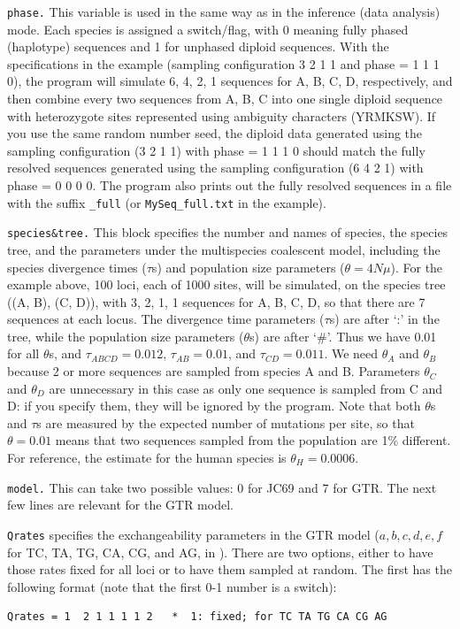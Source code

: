 \documentclass[a4paper]{book}
\numberwithin{equation}{section} \renewcommand{\baselinestretch}{0.55}
\begin{document}
\texttt{phase.}  This variable is used in the same way as in the
inference (data analysis) mode. Each species is assigned a
switch/flag, with 0 meaning fully phased (haplotype) sequences and 1
for unphased diploid sequences.  With the specifications in the
example (sampling configuration 3 2 1 1 and phase = 1 1 1 0), the
program will simulate 6, 4, 2, 1 sequences for A, B, C, D,
respectively, and then combine every two sequences from A, B, C into
one single diploid sequence with heterozygote sites represented using
ambiguity characters (YRMKSW).  If you use the same random number
seed, the diploid data generated using the sampling configuration (3 2
1 1) with phase = 1 1 1 0 should match the fully resolved sequences
generated using the sampling configuration (6 4 2 1) with phase = 0 0
0 0.  The program also prints out the fully resolved sequences in a
file with the suffix \texttt{\_full} (or \texttt{MySeq\_full.txt} in
the example).

\texttt{species\&tree.}  This block specifies the number and names of
species, the species tree, and the parameters under the multispecies
coalescent model, including the species divergence times ($\tau$s) and
population size parameters ($\theta = 4N\mu$).  For the example above,
100 loci, each of 1000 sites, will be simulated, on the species tree
((A, B), (C, D)), with 3, 2, 1, 1 sequences for A, B, C, D, so that
there are 7 sequences at each locus.  The divergence time parameters
($\tau$s) are after `:' in the tree, while the population size
parameters ($\theta$s) are after `\#'.  Thus we have 0.01 for all
$\theta$s, and $\tau_{ABCD} = 0.012$, $\tau_{AB} = 0.01$, and
$\tau_{CD} = 0.011$.  We need $\theta_A$ and $\theta_B$ because 2 or
more sequences are sampled from species A and B.  Parameters
$\theta_C$ and $\theta_D$ are unnecessary in this case as only one
sequence is sampled from C and D: if you specify them, they will be
ignored by the program.  Note that both $\theta$s and $\tau$s are
measured by the expected number of mutations per site, so that
$\theta = 0.01$ means that two sequences sampled from the population
are 1\% different.  For reference, the estimate for the human species
is $\theta_H = 0.0006$.

\texttt{model.} This can take two possible values: 0 for JC69 and 7
for GTR. The next few lines are relevant for the GTR model.

\texttt{Qrates} specifies the exchangeability parameters in the GTR
model ($a, b, c, d, e, f$ for TC, TA, TG, CA, CG, and AG, in
\citealt{Yang1994a}). There are two options, either to have those
rates fixed for all loci or to have them sampled at random.  The first
has the following format (note that the first 0-1 number is a switch):
\begin{verbatim}
Qrates = 1  2 1 1 1 1 2   *  1: fixed; for TC TA TG CA CG AG
\end{verbatim}
\end{document}

